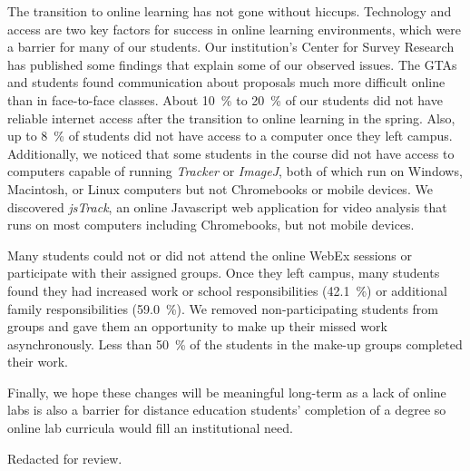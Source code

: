 \documentclass[aip, numerical, preprint]{revtex4-2}
\begin{document}
The transition to online learning has not gone without hiccups.  Technology and access are two
key factors for success in online learning environments, which were a barrier for many of our
students.  Our institution's Center for Survey Research has published some findings that
explain some of our observed issues.\citep{ECUcovidSurveyRedacted} The GTAs and students found
communication about proposals much more difficult online than in face-to-face classes.  About
\SI{10}{\percent} to \SI{20}{\percent} of our students did not have reliable internet access
after the transition to online learning in the spring.\citep{ECUcovidSurveyRedacted} Also, up
to \SI{8}{\percent} of students did not have access to a computer once they left
campus.\citep{ECUcovidSurveyRedacted} Additionally, we noticed that some students in the course
did not have access to computers capable of running \emph{Tracker} or \emph{ImageJ}, both of
which run on Windows, Macintosh, or Linux computers but not Chromebooks or mobile devices. We
discovered \emph{jsTrack}\citep{jstrack}, an online Javascript web application for video
analysis that runs on most computers including Chromebooks, but not mobile devices.

Many students could not or did not attend the online WebEx sessions or participate with their
assigned groups.  Once they left campus, many students found they had increased work or school
responsibilities (\SI{42.1}{\percent}) or additional family responsibilities
(\SI{59.0}{\percent}).\citep{ECUcovidSurveyRedacted} We removed non-participating students from
groups and gave them an opportunity to make up their missed work asynchronously. Less than
\SI{50}{\percent} of the students in the make-up groups completed their work.

Finally, we hope these changes will be meaningful long-term as a lack of online labs is also a
barrier for distance education students' completion of a degree so online lab curricula would
fill an institutional need.


\begin{acknowledgments}
  Redacted for review.%
\end{acknowledgments}


\end{document}

